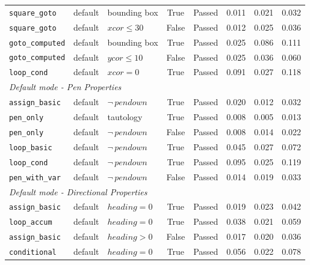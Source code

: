 {\begin{longtable}{p{} p{} p{} c c r r r}
\midrule
\texttt{square\_goto}    & default & bounding box                        & True  & Passed & 0.011 & 0.021 & 0.032 \\
\texttt{square\_goto}    & default & $\mathit{xcor}\leq 30$              & False & Passed & 0.012 & 0.025 & 0.036 \\
\texttt{goto\_computed}  & default & bounding box                        & True  & Passed & 0.025 & 0.086 & 0.111 \\
\texttt{goto\_computed}  & default & $\mathit{ycor}\leq 10$              & False & Passed & 0.025 & 0.036 & 0.060 \\
\texttt{loop\_cond}      & default & $\mathit{xcor}=0$                   & True  & Passed & 0.091 & 0.027 & 0.118 \\
\midrule
\multicolumn{8}{l}{\textit{Default mode - Pen Properties}} \\
\midrule
\texttt{assign\_basic}   & default & $\neg\,\mathit{pendown}$           & True  & Passed & 0.020 & 0.012 & 0.032 \\
\texttt{pen\_only}       & default & tautology                           & True  & Passed & 0.008 & 0.005 & 0.013 \\
\texttt{pen\_only}       & default & $\neg\,\mathit{pendown}$           & False & Passed & 0.008 & 0.014 & 0.022 \\
\texttt{loop\_basic}     & default & $\neg\,\mathit{pendown}$           & True  & Passed & 0.045 & 0.027 & 0.072 \\
\texttt{loop\_cond}      & default & $\neg\,\mathit{pendown}$           & True  & Passed & 0.095 & 0.025 & 0.119 \\
\texttt{pen\_with\_var}  & default & $\neg\,\mathit{pendown}$           & False & Passed & 0.014 & 0.019 & 0.033 \\
\midrule
\multicolumn{8}{l}{\textit{Default mode - Directional Properties}} \\
\midrule
\texttt{assign\_basic}   & default & $\mathit{heading}=0$               & True  & Passed  & 0.019 & 0.023 & 0.042 \\
\texttt{loop\_accum}     & default & $\mathit{heading}=0$               & True  & Passed  & 0.038 & 0.021 & 0.059 \\
\texttt{assign\_basic}   & default & $\mathit{heading}>0$               & False & Passed  & 0.017 & 0.020 & 0.036 \\
\texttt{conditional}     & default & $\mathit{heading}=0$               & True  & Passed  & 0.056 & 0.022 & 0.078 \\

\end{longtable}}
